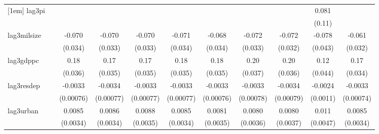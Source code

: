 \begin{table}[htbp]
\begin{tabular}{l*{10}{c}}
[1em]
lag3pi              &                     &                     &                     &                     &                     &                     &                     &                     &       0.081         &                     \\
                    &                     &                     &                     &                     &                     &                     &                     &                     &      (0.11)         &                     \\
[1em]
lag3milsize         &                     &      -0.070\sym{*}  &      -0.070\sym{*}  &      -0.070\sym{*}  &      -0.071\sym{*}  &      -0.068\sym{*}  &      -0.072\sym{*}  &      -0.072\sym{*}  &      -0.078         &      -0.061         \\
                    &                     &     (0.034)         &     (0.033)         &     (0.033)         &     (0.034)         &     (0.034)         &     (0.033)         &     (0.032)         &     (0.043)         &     (0.032)         \\
[1em]
lag3gdppc           &                     &        0.18\sym{***}&        0.17\sym{***}&        0.17\sym{***}&        0.18\sym{***}&        0.18\sym{***}&        0.20\sym{***}&        0.20\sym{***}&        0.12\sym{**} &        0.17\sym{***}\\
                    &                     &     (0.036)         &     (0.035)         &     (0.035)         &     (0.035)         &     (0.035)         &     (0.037)         &     (0.036)         &     (0.044)         &     (0.034)         \\
[1em]
lag3resdep          &                     &     -0.0033\sym{***}&     -0.0034\sym{***}&     -0.0033\sym{***}&     -0.0033\sym{***}&     -0.0033\sym{***}&     -0.0033\sym{***}&     -0.0034\sym{***}&     -0.0024\sym{*}  &     -0.0033\sym{***}\\
                    &                     &   (0.00076)         &   (0.00077)         &   (0.00077)         &   (0.00077)         &   (0.00076)         &   (0.00078)         &   (0.00079)         &    (0.0011)         &   (0.00074)         \\
[1em]
lag3urban           &                     &      0.0085\sym{*}  &      0.0086\sym{*}  &      0.0088\sym{*}  &      0.0085\sym{*}  &      0.0081\sym{*}  &      0.0080\sym{*}  &      0.0080\sym{*}  &       0.011\sym{*}  &      0.0085\sym{*}  \\
                    &                     &    (0.0034)         &    (0.0034)         &    (0.0035)         &    (0.0034)         &    (0.0035)         &    (0.0036)         &    (0.0037)         &    (0.0047)         &    (0.0034)         \\

\end{tabular}
\end{table}
